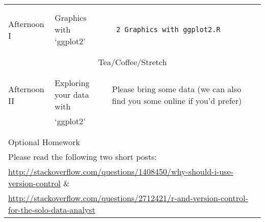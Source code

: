 \documentclass{article}[12pt]
\begin{document}
\begin{table}[h!]
\begin{tabular}{ |p{2cm}|p{5cm}|p{6cm}| }
                               &                              & \\
                               &                              & \\
Afternoon I                    & Graphics with `ggplot2'      & \begin{verbatim} 2_Graphics_with_ggplot2.R \end{verbatim} \\
                               &                              &  \\ \hline
\multicolumn{3}{c}{} \\
\multicolumn{3}{c}{Tea/Coffee/Stretch}  \\ 
\multicolumn{3}{c}{} \\ \hline
 & & \\
Afternoon II                   & Exploring your data with & Please bring some data (we can also find you some online if you'd prefer)\\
                               &  `ggplot2'               &  \\
                               &                              & \\ \hline
\hline
\multicolumn{3}{c}{} \\ 
\multicolumn{3}{l}{Optional Homework}  \\
\multicolumn{3}{l}{Please read the following two short posts:}  \\
\multicolumn{3}{l}{\href{http://stackoverflow.com/questions/1408450/why-should-i-use-version-control}{http://stackoverflow.com/questions/1408450/why-should-i-use-version-control} \&} \\
\multicolumn{3}{l}{\href{http://stackoverflow.com/questions/2712421/r-and-version-control-for-the-solo-data-analyst}{http://stackoverflow.com/questions/2712421/r-and-version-control-for-the-solo-data-analyst}} \\
\end{tabular}
\end{table}

\clearpage
\end{document}
